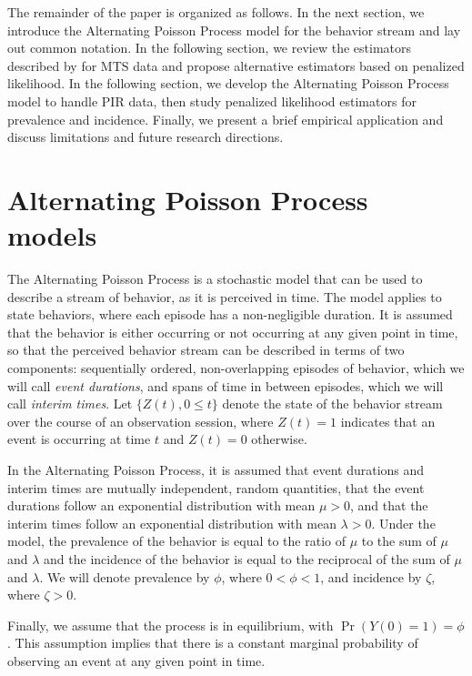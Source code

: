 \documentclass[man, noextraspace, floatsintext]{apa6}\usepackage[]{graphicx}\usepackage[]{color}
\begin{document}

The remainder of the paper is organized as follows. In the next section, we introduce the Alternating Poisson Process model for the behavior stream and lay out common notation. In the following section, we review the estimators described by \citet{Brown1977estimation} for MTS data and propose alternative estimators based on penalized likelihood. In the following section, we develop the Alternating Poisson Process model to handle PIR data, then study penalized likelihood estimators for prevalence and incidence. Finally, we present a brief empirical application and discuss limitations and future research directions.

\section{Alternating Poisson Process models}
\label{sec:APP}

The Alternating Poisson Process is a stochastic model that can be used to describe a stream of behavior, as it is perceived in time. The model applies to state behaviors, where each episode has a non-negligible duration. It is assumed that the behavior is either occurring or not occurring at any given point in time, so that the perceived behavior stream can be described in terms of two components: sequentially ordered, non-overlapping episodes of behavior, which we will call \textit{event durations}, and spans of time in between episodes, which we will call \textit{interim times}. Let $\{Z(t), 0 \leq t\}$ denote the state of the behavior stream over the course of an observation session, where $Z(t) = 1$ indicates that an event is occurring at time $t$ and $Z(t) = 0$ otherwise.

In the Alternating Poisson Process, it is assumed that event durations and interim times are mutually independent, random quantities, that the event durations follow an exponential distribution with mean $\mu > 0$, and that the interim times follow an exponential distribution with mean $\lambda > 0$.  Under the model, the prevalence of the behavior is equal to the ratio of $\mu$ to the sum of $\mu$ and $\lambda$ and the incidence of the behavior is equal to the reciprocal of the sum of $\mu$ and $\lambda$. We will denote prevalence by $\phi$, where $0 < \phi < 1$, and incidence by $\zeta$, where $\zeta > 0$. 

Finally, we assume that the process is in equilibrium, with $\Pr\left(Y(0) = 1\right) = \phi$. This assumption implies that there is a constant marginal probability of observing an event at any given point in time.
\end{document}
